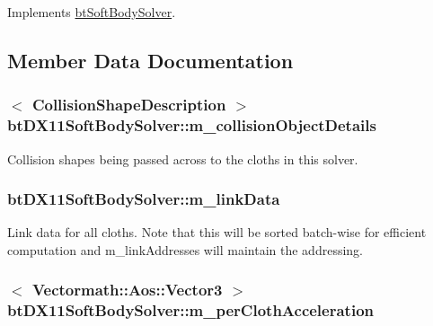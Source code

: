 Implements \hyperlink{classbt_soft_body_solver_adac4b4f20eee46dc4fab26ed25be89ef}{bt\+Soft\+Body\+Solver}.



\subsection{Member Data Documentation}
\hypertarget{classbt_d_x11_soft_body_solver_a9a817decf988b55a5e93e7562f6ff83f}{
\subsubsection[{m\+\_\+collision\+Object\+Details}]{$<$ {\bf Collision\+Shape\+Description} $>$ bt\+D\+X11\+Soft\+Body\+Solver\+::m\+\_\+collision\+Object\+Details\hspace{0.3cm}{\ttfamily [protected]}}}\label{classbt_d_x11_soft_body_solver_a9a817decf988b55a5e93e7562f6ff83f}
Collision shapes being passed across to the cloths in this solver. \hypertarget{classbt_d_x11_soft_body_solver_a0477894bad3bbed9dcfd7922baeb782d}{
\subsubsection[{m\+\_\+link\+Data}]{ bt\+D\+X11\+Soft\+Body\+Solver\+::m\+\_\+link\+Data}}\label{classbt_d_x11_soft_body_solver_a0477894bad3bbed9dcfd7922baeb782d}
Link data for all cloths. Note that this will be sorted batch-\/wise for efficient computation and m\+\_\+link\+Addresses will maintain the addressing. \hypertarget{classbt_d_x11_soft_body_solver_a78b69812eb1dad36cc177d2b5b22dd15}{
\subsubsection[{m\+\_\+per\+Cloth\+Acceleration}]{$<$ {\bf Vectormath\+::\+Aos\+::\+Vector3} $>$ bt\+D\+X11\+Soft\+Body\+Solver\+::m\+\_\+per\+Cloth\+Acceleration\hspace{0.3cm}{\ttfamily [protected]}}}\label{classbt_d_x11_soft_body_solver_a78b69812eb1dad36cc177d2b5b22dd15}
